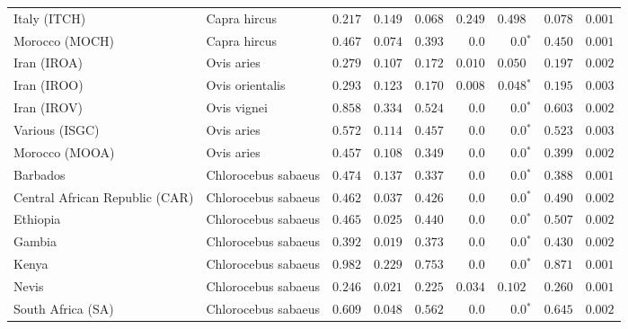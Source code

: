 \begin{center}
\begin{adjustbox}{width = 1\textwidth}
\begin{tabular}{|l|l|r|r|r|r|r|r|r|}
            Italy (ITCH)                    & Capra hircus          & $ 0.217$ & $ 0.149$ & $ 0.068$ & $ 0.249$ & $ 0.498~~$        & $ 0.078$ & $ 0.001$  \\
            Morocco (MOCH)                    & Capra hircus     & $ 0.467$ & $ 0.074$ & $ 0.393$ & $0.0$ & $\bm{0.0{^*}}$ & $ 0.450$ & $ 0.001$ \\
            Iran (IROA)                    & Ovis aries         & $ 0.279$ & $ 0.107$ & $ 0.172$ & $ 0.010$    & $ 0.050~~$    & $ 0.197$ & $ 0.002$ \\
            Iran (IROO)                 & Ovis orientalis          & $ 0.293$ & $ 0.123$ & $ 0.170$ & $ 0.008$    & $\bm{ 0.048{^*}}$    & $ 0.195$ & $ 0.003$ \\
            Iran (IROV)                 & Ovis vignei          & $ 0.858$ & $ 0.334$ & $ 0.524$ & $0.0$    & $\bm{0.0{^*}}$    & $ 0.603$ & $ 0.002$ \\
            Various (ISGC)                       & Ovis aries & $ 0.572$ & $ 0.114$ & $ 0.457$ & $0.0$    & $\bm{0.0{^*}}$    & $ 0.523$ & $ 0.003$ \\
            Morocco (MOOA) & Ovis aries & $ 0.457$ & $ 0.108$ & $ 0.349$ & $0.0$ & $\bm{0.0{^*}}$ & $ 0.399$ & $ 0.002$ \\
            Barbados                       & Chlorocebus sabaeus & $ 0.474$ & $ 0.137$ & $ 0.337$ & $0.0$    & $\bm{0.0{^*}}$    & $ 0.388$ & $ 0.001$ \\
            Central African Republic (CAR)                         & Chlorocebus sabaeus & $ 0.462$ & $ 0.037$ & $ 0.426$ & $0.0$    & $\bm{0.0{^*}}$    & $ 0.490$ & $ 0.002$ \\
            Ethiopia                          & Chlorocebus sabaeus & $ 0.465$ & $ 0.025$ & $ 0.440$ & $0.0$    & $\bm{0.0{^*}}$    & $ 0.507$ & $ 0.002$ \\
            Gambia                          & Chlorocebus sabaeus & $ 0.392$ & $ 0.019$ & $ 0.373$ & $0.0$ & $\bm{0.0{^*}}$        & $ 0.430$ & $ 0.002$ \\
            Kenya              & Chlorocebus sabaeus & $ 0.982$ & $ 0.229$ & $ 0.753$ & $0.0$    & $\bm{0.0{^*}}$ & $ 0.871$ & $ 0.001$ \\
            Nevis               & Chlorocebus sabaeus & $ 0.246$ & $ 0.021$ & $ 0.225$ & $ 0.034$    & $ 0.102~~$ & $ 0.260$ & $ 0.001$ \\
            South Africa (SA)                         & Chlorocebus sabaeus & $ 0.609$ & $ 0.048$ & $ 0.562$ & $0.0$    & $\bm{0.0{^*}}$    & $ 0.645$ & $ 0.002$ \\

\end{tabular}
\end{adjustbox}
\end{center}
